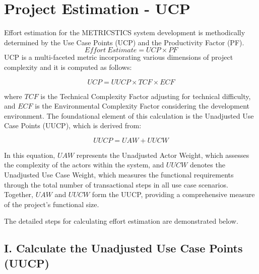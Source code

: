 \documentclass[english,12pt,a4paper]{report}
\begin{document}
	\section{Project Estimation - UCP}
	Effort estimation for the METRICSTICS system development is methodically determined by the Use Case Points (UCP) and  the Productivity Factor (PF).
	\begin{equation}
		Effort\ Estimate = UCP \times PF
	\end{equation} 
	UCP is a multi-faceted metric incorporating various dimensions of project complexity and it is computed as follows:
	
	\begin{equation}
		UCP = UUCP \times TCF \times ECF
	\end{equation}
	
	\begin{flushleft}
		where \( TCF \) is the Technical Complexity Factor adjusting for technical difficulty, and \( ECF \) is the Environmental Complexity Factor considering the development environment. The foundational element of this calculation is the Unadjusted Use Case Points (UUCP), which is derived from:
		
		\begin{equation}
			UUCP = UAW + UUCW
		\end{equation}
		
		In this equation, \( UAW \) represents the Unadjusted Actor Weight, which assesses the complexity of the actors within the system, and \( UUCW \) denotes the Unadjusted Use Case Weight, which measures the functional requirements through the total number of transactional steps in all use case scenarios. Together, \( UAW \) and \( UUCW \) form the UUCP, providing a comprehensive measure of the project's functional size.
	\end{flushleft}
	
	\begin{flushleft}
		The detailed steps for calculating effort estimation are demonstrated below.
	\end{flushleft}
	
	\subsection*{I. Calculate the Unadjusted Use Case Points (UUCP)}
	
\end{document}

